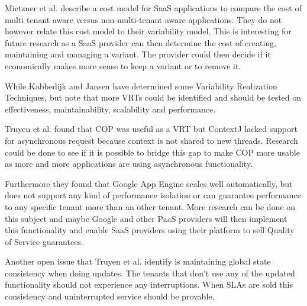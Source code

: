Mietzner et al. \cite{mietzner2009variability} describe a cost model for SaaS applications to compare the cost of multi tenant aware versus non-multi-tenant aware applications. They do not however relate this cost model to their variability model. This is interesting for future research as a SaaS provider can then determine the cost of creating, maintaining and managing a variant. The provider could then decide if it economically makes more sense to keep a variant or to remove it.


While Kabbedijk and Jansen \cite{kabbedijk2011variability} have determined some Variability Realization Techniques, but note that more VRTs could be identified and should be tested on effectiveness, maintainability, scalability and performance.

Truyen et al. \cite{truyen2012context} found that COP was useful as a VRT but ContextJ lacked support for asynchronous request because context is not shared to new threads. Research could be done to see if it is possible to bridge this gap to make COP more usable as more and more applications are using asynchronous functionality.

Furthermore they found that Google App Engine scales well automatically, but does not support any kind of performance isolation or can guarantee performance to any specific tenant more than an other tenant. More research can be done on this subject and maybe Google and other PaaS providers will then implement this functionality and enable SaaS providers using their platform to sell Quality of Service guarantees.

Another open issue that Truyen et al. identify is maintaining global state consistency when doing updates. The tenants that don't use any of the updated functionality should not experience any interruptions. When SLAs are sold this consistency and uninterrupted service should be provable.

